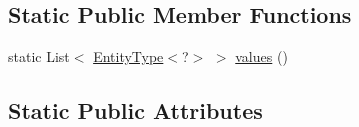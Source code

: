 \subsection*{Static Public Member Functions}
\begin{DoxyCompactItemize}
\item 
static List$<$ \hyperlink{classorg_1_1semanticweb_1_1owlapi_1_1model_1_1_entity_type_3_01_e_01extends_01_o_w_l_entity_01_4_a69573aa3044dd02aabd1c8bac00cb4e6}{Entity\-Type}$<$?$>$ $>$ \hyperlink{classorg_1_1semanticweb_1_1owlapi_1_1model_1_1_entity_type_3_01_e_01extends_01_o_w_l_entity_01_4_a7c31c52ec2a83ceb9061bbff1dc5cf8b}{values} ()
\end{DoxyCompactItemize}
\subsection*{Static Public Attributes}
